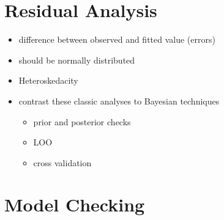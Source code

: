 \documentclass[
]{article}
\providecommand{\tightlist}{%
  \setlength{\itemsep}{0pt}\setlength{\parskip}{0pt}}
\begin{document}
\hypertarget{residual-analysis}{%
\section{Residual Analysis}\label{residual-analysis}}

\begin{itemize}
\tightlist
\item
  difference between observed and fitted value (errors)
\item
  should be normally distributed
\item
  Heteroskedacity
\item
  contrast these classic analyses to Bayesian techniques

  \begin{itemize}
  \tightlist
  \item
    prior and posterior checks
  \item
    LOO
  \item
    cross validation
  \end{itemize}
\end{itemize}

\hypertarget{model-checking}{%
\section{Model Checking}\label{model-checking}}
\end{document}
